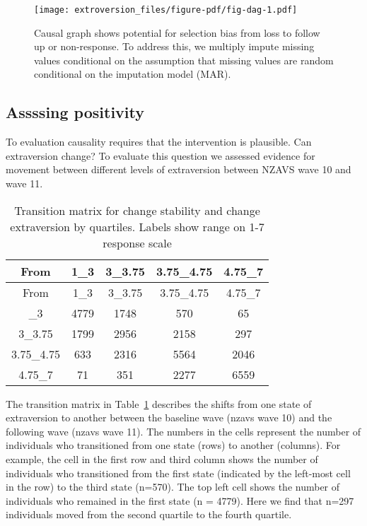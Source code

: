 \documentclass[
  singlecolumn]{report}
\begin{document}
\begin{figure}

{\centering \texttt{[image: extroversion\_files/figure-pdf/fig-dag-1.pdf]}

}

\caption{\label{fig-dag}Causal graph shows potential for selection bias
from loss to follow up or non-response. To address this, we multiply
impute missing values conditional on the assumption that missing values
are random conditional on the imputation model (MAR).}

\end{figure}

\hypertarget{assssing-positivity}{%
\subsection{Assssing positivity}\label{assssing-positivity}}

To evaluation causality requires that the intervention is plausible. Can
extraversion change? To evaluate this question we assessed evidence for
movement between different levels of extraversion between NZAVS wave 10
and wave 11.

\hypertarget{tbl-transition-factor}{}
\begin{longtable}[]{@{}ccccc@{}}
\caption{\label{tbl-transition-factor}Transition matrix for change
stability and change extraversion by quartiles. Labels show range on 1-7
response scale}\tabularnewline
\toprule\noalign{}
From & 1\_3 & 3\_3.75 & 3.75\_4.75 & 4.75\_7 \\
\midrule\noalign{}
\endfirsthead
\toprule\noalign{}
From & 1\_3 & 3\_3.75 & 3.75\_4.75 & 4.75\_7 \\
\midrule\noalign{}
\endhead
\bottomrule\noalign{}
\endlastfoot
1\_3 & 4779 & 1748 & 570 & 65 \\
3\_3.75 & 1799 & 2956 & 2158 & 297 \\
3.75\_4.75 & 633 & 2316 & 5564 & 2046 \\
4.75\_7 & 71 & 351 & 2277 & 6559 \\
\end{longtable}

The transition matrix in Table~\ref{tbl-transition-factor} describes the
shifts from one state of extraversion to another between the baseline
wave (nzavs wave 10) and the following wave (nzavs wave 11). The numbers
in the cells represent the number of individuals who transitioned from
one state (rows) to another (columns). For example, the cell in the
first row and third column shows the number of individuals who
transitioned from the first state (indicated by the left-most cell in
the row) to the third state (n=570). The top left cell shows the number
of individuals who remained in the first state (n = 4779). Here we find
that n=297 individuals moved from the second quartile to the fourth
quartile.
\end{document}
